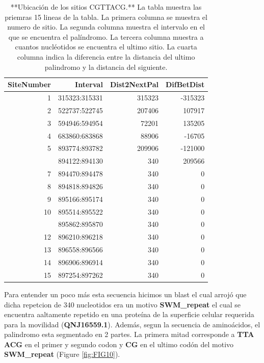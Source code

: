 \documentclass[
]{book}
\begin{document}
\begin{table}

\caption{\label{tab:TAB2}**Ubicación de los sitios CGTTACG.** La tabla muestra las priemras 15 lineas de la tabla. La primera columna se muestra el numero de sitio. La segunda columna muestra el intervalo en el que se encuentra el palíndromo. La tercera columna muestra a cuantos nucléotidos se encuentra el ultimo sitio. La cuarta columna indica la diferencia entre la distancia del ultimo palindromo y la distancia del siguiente.}
\centering
\begin{tabular}[t]{rrrr}
\toprule
SiteNumber & Interval & Dist2NextPal & DifBetDist\\
\midrule
1 & 315323:315331 & 315323 & -315323\\
2 & 522737:522745 & 207406 & 107917\\
3 & 594946:594954 & 72201 & 135205\\
4 & 683860:683868 & 88906 & -16705\\
5 & 893774:893782 & 209906 & -121000\\
\addlinespace
6 & 894122:894130 & 340 & 209566\\
7 & 894470:894478 & 340 & 0\\
8 & 894818:894826 & 340 & 0\\
9 & 895166:895174 & 340 & 0\\
10 & 895514:895522 & 340 & 0\\
\addlinespace
11 & 895862:895870 & 340 & 0\\
12 & 896210:896218 & 340 & 0\\
13 & 896558:896566 & 340 & 0\\
14 & 896906:896914 & 340 & 0\\
15 & 897254:897262 & 340 & 0\\
\bottomrule
\end{tabular}
\end{table}

Para entender un poco más esta secuencia hicimos un blast el cual arrojó que dicha repetcion de 340 nucleotidos era un motivo \textbf{SWM\_repeat} el cual se encuentra aaltamente repetido en una proteína de la superficie celular requerida para la movilidad (\textbf{QNJ16559.1}). Además, segun la secuencia de aminoácidos, el palindromo esta segmentado en 2 partes. La primera mitad corresponde a \textbf{TTA ACG} en el primer y segundo codon y \textbf{CG} en el ultimo codón del motivo \textbf{SWM\_repeat} (Figure \ref{fig:FIG10}).
\end{document}

